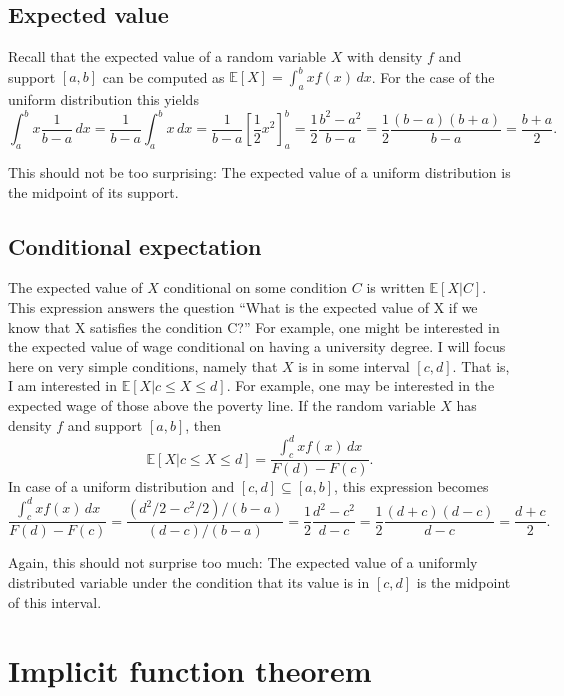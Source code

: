 \documentclass[a4paper,12pt]{article}
\begin{document}
\subsection{Expected value}
\label{sec:expected-value}

Recall that the expected value of a random variable $X$ with density $f$ and support $[a,b]$ can be computed as $\mathbb{E}[X]=\int_a^bxf(x)\,dx$. For the case of the uniform distribution this yields
$$\int_a^bx\frac{1}{b-a}\,dx=\frac{1}{b-a}\int_a^bx\,dx=\frac{1}{b-a} [\frac{1}{2}x^2]_a^b=\frac{1}{2}\frac{b^2-a^2}{b-a}=\frac{1}{2}\frac{(b-a)(b+a)}{b-a}=\frac{b+a}{2}.$$

This should not be too surprising: The expected value of a uniform distribution is the midpoint of its support. 

\subsection{Conditional expectation}
\label{sec:cond-expect}

The expected value of $X$ conditional on some condition $C$ is written $\mathbb{E}[X|C]$. This expression answers the question ``What is the expected value of X if we know that X satisfies the condition C?'' For example, one might be interested in the expected value of wage conditional on having a university degree. I will focus here on very simple conditions, namely that $X$ is in some interval $[c,d]$. That is, I am interested in $\mathbb{E}[X|c\leq X\leq d]$. For example, one may be interested in the expected wage of those above the poverty line. If the random variable $X$ has density $f$ and support $[a,b]$, then 
$$\mathbb{E}[X|c\leq X\leq d]=\frac{\int_c^dxf(x)\,dx}{F(d)-F(c)}.$$
In case of a uniform distribution and $[c,d]\subseteq[a,b]$, this expression becomes
$$\frac{\int_c^dxf(x)\,dx}{F(d)-F(c)}=\frac{(d^2/2-c^2/2)/(b-a)}{(d-c)/(b-a)}=\frac{1}{2}\frac{d^2-c^2}{d-c}=\frac{1}{2}\frac{(d+c)(d-c)}{d-c}=\frac{d+c}{2}.$$

Again, this should not surprise too much: The expected value of a uniformly distributed variable under the condition that its value is in $[c,d]$ is the midpoint of this interval. 

\section{Implicit function theorem}
\label{sec:impl-funct-theor}
\end{document}
